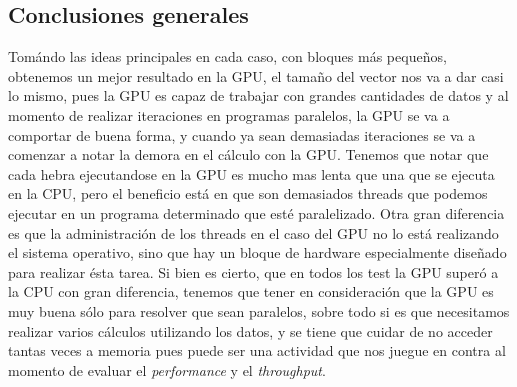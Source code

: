 \subsection{Conclusiones generales}
Tomándo las ideas principales en cada caso, con bloques más pequeños, obtenemos un mejor 
resultado en la GPU, el tamaño del vector nos va a dar casi lo mismo, pues la GPU
es capaz de trabajar con grandes cantidades de datos y al momento de realizar iteraciones
en programas paralelos, la GPU se va a comportar de buena forma, y cuando ya sean demasiadas
iteraciones se va a comenzar a notar la demora en el cálculo con la GPU. 
Tenemos que notar que cada hebra ejecutandose en la GPU es mucho mas lenta que una que se
ejecuta en la CPU, pero el beneficio está en que son demasiados threads que podemos
ejecutar en un programa determinado que esté paralelizado.
Otra gran diferencia es que la administración de los threads en el caso del GPU
no lo está realizando el sistema operativo, sino que hay un bloque de hardware especialmente
diseñado para realizar ésta tarea.
Si bien es cierto, que en todos los test la GPU superó a la CPU con gran diferencia,
tenemos que tener en consideración que la GPU es muy buena sólo para resolver
que sean paralelos, sobre todo si es que necesitamos realizar varios cálculos utilizando
los datos, y se tiene que cuidar de no acceder tantas veces a memoria pues puede ser
una actividad que nos juegue en contra al momento de evaluar el \emph{performance} y
el \emph{throughput}.
